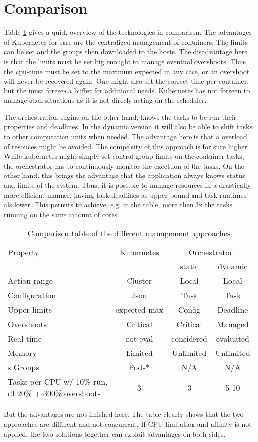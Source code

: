 \documentclass[]{scrartcl}
\begin{document}
\section{Comparison}

Table \ref{tab:approach} gives a quick overview of the technologies in comparison.
The advantages of Kubernetes for sure are the centralized management of containers. The limits can be set and the groups then downloaded to the hosts. The disadvantage here is that the limits must be set big enought to manage eventual overshoots. Thus the cpu-time must be set to the maximum expected in any case, or an overshoot will never be recovered again. One might also set the correct time per container, but the must foresee a buffer for additional needs.
Kubernetes has not forseen to manage such situations as it is not direcly acting on the scheduler.

The orchestration engine on the other hand, knows the tasks to be run their properties and deadlines. In the dynamic version it will also be able to shift tasks to other computation units when needed. The advantage here is that a overload of resouces might be avoided.
The compelsity of this approach is for sure higher. While kubernetes might simply set control group limits on the container tasks, the orchestrator has to continuously monitor the exectuon of the tasks.
On the other hand, this brings the advantage that the application always knows status and limits of the system. Tbus, it is possible to manage resources in a drastically more efficient manner, having task deadlines as upper bound and task runtimes als lower. This permits to achieve, e.g. in the table, more then 3x the tasks running on the same amount of cores.

\begin{table}[ht]
	\centering
	\begin{tabular}{l c c c}
		Property & Kubernetes & \multicolumn{2}{c}{Orchestrator} \\
		& & static & dynamic \\
		\toprule
		Action range & Cluster & Local & Local \\
		Configuration & Json & Task & Task \\
		\midrule
		Upper limits & expected max & Config & Deadline \\
		Overshoots & Critical & Critical & Managed \\
		Real-time & not eval & considered & evaluated \\
		\midrule
		Memory & Limited & Unlimited & Unlimited \\s
		Groups & Pods* & N/A & N/A\\
		\midrule
		\shortstack{Tasks per CPU w/ 10\% run,\\
		 dl 20\% + 300\% overshoots} & 3 & 3 & 5-10\\		
		\bottomrule
	\end{tabular}
	\caption{Comparison table of the different management approaches}
	\label{tab:approach}
\end{table}

But the advantages are not finished here: 
The table clearly shows that the two approaches are different and not concurrent. If CPU limitation and affinity is not applied, the two solutions together can exploit advantages on both sides. 
\end{document}

